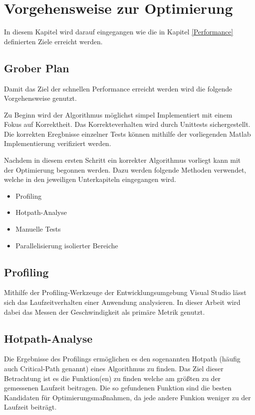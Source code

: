 \chapter{Vorgehensweise zur Optimierung}

In diesem Kapitel wird darauf eingegangen wie die in Kapitel \ref{Performance} definierten Ziele erreicht werden.


\section{Grober Plan}

Damit das Ziel der schnellen Performance erreicht werden wird die folgende Vorgehensweise genutzt.

Zu Beginn wird der Algorithmus möglichst simpel Implementiert mit einem Fokus auf Korrektheit. 
Das Korrekteverhalten wird durch Unittests sichergestellt. Die korrekten Eregbnisse einzelner Tests können mithilfe der vorliegenden Matlab Implementierung verifiziert werden.

Nachdem in diesem ersten Schritt ein korrekter Algorithmus vorliegt kann mit der Optimierung begonnen werden.
Dazu werden folgende Methoden verwendet, welche in den jeweiligen Unterkapiteln eingegangen wird.

\begin{itemize}
    \item Profiling
    \item Hotpath-Analyse
    \item Manuelle Tests
    \item Parallelisierung isolierter Bereiche
\end{itemize}

\section{Profiling}

Mithilfe der Profiling-Werkzeuge der Entwicklungsumgebung Visual Studio lässt sich das Laufzeitverhalten einer Anwendung analysieren.
In dieser Arbeit wird dabei das Messen der Geschwindigkeit als primäre Metrik genutzt. 


\section{Hotpath-Analyse}

Die Ergebnisse des Profilings ermöglichen es den sogenannten Hotpath (häufig auch Critical-Path genannt) eines Algorithmus zu finden.
Das Ziel dieser Betrachtung ist es die Funktion(en) zu finden welche am größten zu der gemessenen Laufzeit beitragen. 
Die so gefundenen Funktion sind die besten Kandidaten für Optimierungsmaßnahmen, da jede andere Funkion weniger zu der Laufzeit beiträgt.


